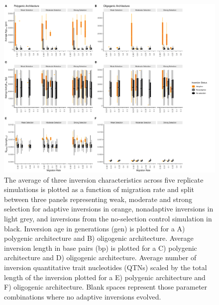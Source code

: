 \documentclass[10pt, oneside]{amsart}
\begin{document}
\clearpage
\newpage

\begin{figure}[h]
	\begin{center}
		\includegraphics[width = 6.5 in]{Fig2_invChar_boxplot_noOutliers.pdf}
	\end{center}
	\caption[Inversion Characteristics]{The average of three inversion characteristics across five replicate simulations is plotted as a function of migration rate and split between three panels representing weak, moderate and strong selection for adaptive inversions in orange, nonadaptive inversions in light grey, and inversions from the no-selection control simulation in black. Inversion age in generations (gen) is plotted for a A) polygenic architecture and B) oligogenic architecture. Average inversion length in base pairs (bp) is plotted for a C) polygenic architecture and D) oligogenic architecture. Average number of inversion quantitative trait nucleotides (QTNs) scaled by the total length of the inversion plotted for a E) polygenic architecture and F) oligogenic architecture. Blank spaces represent those parameter combinations where no adaptive inversions evolved.}
\end{figure}

\clearpage
\newpage
\end{document}
